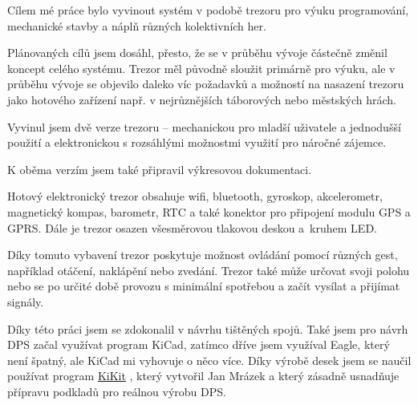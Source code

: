 \pagestyle{empty}
\pagestyle{plain}
{\setlength{\voffset}{-10mm} 

Cílem mé práce bylo vyvinout systém v podobě trezoru pro výuku programování, mechanické stavby a náplň různých kolektivních her. 

Plánovaných cílů jsem dosáhl, přesto, že se v průběhu vývoje částečně změnil koncept celého systému. Trezor měl původně sloužit primárně pro výuku, ale v průběhu vývoje 
se objevilo daleko víc požadavků a možností na nasazení trezoru jako hotového zařízení např. v nejrůznějších táborových nebo městských hrách. 

Vyvinul jsem dvě verze trezoru -- mechanickou pro mladší uživatele %
a jednodušší použití a elektronickou s rozsáhlými možnostmi využití pro 
náročné zájemce. 

K oběma verzím jsem také připravil výkresovou dokumentaci. 

Hotový elektronický trezor obsahuje wifi, bluetooth, gyroskop, akcelerometr,
magnetický kompas, barometr, RTC a také konektor pro připojení modulu GPS a GPRS. 
Dále je trezor osazen všesměrovou tlakovou deskou a~kruhem LED.

Díky tomuto vybavení trezor poskytuje možnost 
ovládání pomocí různých gest, například otáčení, naklápění nebo zvedání. 
Trezor také může určovat svoji polohu nebo se po určité době 
provozu s minimální spotřebou  a začít vysílat a přijímat signály.



Díky této práci jsem se zdokonalil v návrhu tištěných spojů. Také jsem pro návrh DPS začal využívat program KiCad, zatímco dříve jsem využíval Eagle, který není špatný, ale KiCad 
mi vyhovuje o něco více. Díky výrobě desek jsem se naučil používat program \href{https://github.com/yaqwsx/KiKit}{KiKit} \parencite{KiKit}, 
který vytvořil Jan Mrázek a který zásadně usnadňuje přípravu podkladů pro reálnou výrobu DPS.

}

